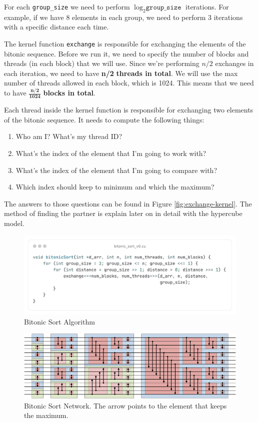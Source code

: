 \documentclass{article}
\begin{document}
For each \texttt{group\_size} we need to perform $\log_2{\texttt{group\_size}}$ iterations. For example, if we have 8
elements in each group, we need to perform 3 iterations with a specific distance each time.

The kernel function \texttt{exchange} is responsible for exchanging the elements of the bitonic sequence. Before we run it,
we need to specify the number of blocks and threads (in each block) that we will use. Since we're performing $n/2$ exchanges
in each iteration, we need to have \textbf{n/2} \textbf{threads in total}. We will use the max number of threads allowed in each block, which
is 1024. This means that we need to have $\mathbf{\frac{n/2}{1024}}$ \textbf{blocks in total}.

Each thread inside the kernel function is responsible for exchanging two elements of the bitonic sequence. It needs to
compute the following things:
\begin{enumerate}
    \item Who am I? What's my thread ID?
    \item What's the index of the element that I'm going to work with?
    \item What's the index of the element that I'm going to compare with?
    \item Which index should keep to minimum and which the maximum?
\end{enumerate}

The answers to those questions can be found in Figure \ref{fig:exchange-kernel}. The method of finding the partner is
explain later on in detail with the hypercube model.

\begin{figure}[H]
    \centering
    \includegraphics[width=1\textwidth]{bitonic_sort.png}
    \caption{Bitonic Sort Algorithm}
    \label{alg:bitonic-sort}
\end{figure}


\begin{figure}[H]
    \centering
    \includegraphics[width=1\textwidth]{bitonic-sort-network.png}
    \caption{Bitonic Sort Network. The arrow points to the element that keeps the maximum.}
    \label{fig:bitonic-sort-network}
\end{figure}
\end{document}
